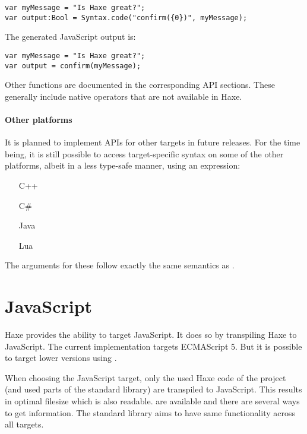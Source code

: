\begin{lstlisting}
var myMessage = "Is Haxe great?";
var output:Bool = Syntax.code("confirm({0})", myMessage);
\end{lstlisting}

The generated JavaScript output is:

\begin{lstlisting}
var myMessage = "Is Haxe great?";
var output = confirm(myMessage);
\end{lstlisting}

Other functions are documented in the corresponding API sections. These generally include native operators that are not available in Haxe.

\paragraph{Other platforms}

It is planned to implement  APIs for other targets in future releases. For the time being, it is still possible to access target-specific syntax on some of the other platforms, albeit in a less type-safe manner, using an  expression:

\begin{itemize}
	\item[C++] 
	\item[C\#] 
	\item[Java] 
	\item[Lua] 
\end{itemize}

The arguments for these follow exactly the same semantics as .

\section{JavaScript}
\label{target-javascript}

Haxe provides the ability to target JavaScript. It does so by transpiling Haxe to JavaScript. The current implementation targets ECMAScript 5. But it is possible to target lower versions using .

When choosing the JavaScript target, only the used Haxe code of the project (and used parts of the standard library) are transpiled to JavaScript. This results in optimal filesize which is also readable.  are available and there are several ways to get  information. The standard library aims to have same functionality across all targets.


